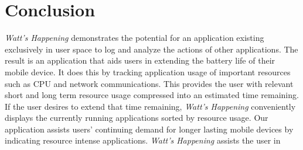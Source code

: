 \section*{Conclusion}

\emph{Watt's Happening} demonstrates the potential for an application existing exclusively in user space to log and analyze the actions of other applications.  
The result is an application that aids users in extending the battery life of their mobile device.
It does this by tracking application usage of important resources such as CPU and network communications.
This provides the user with relevant short and long term resource usage compressed into an estimated time remaining.
If the user desires to extend that time remaining, \emph{Watt's Happening} conveniently displays the currently running applications sorted by resource usage.
Our application assists users' continuing demand for longer lasting mobile devices by indicating resource intense applications. \emph{Watt's Happening} assists the user in  
